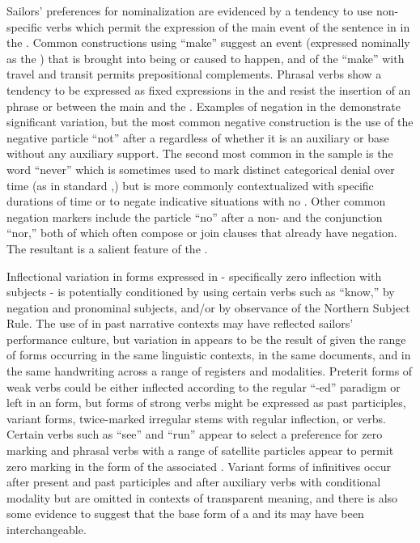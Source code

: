   Sailors’ preferences for nominalization are evidenced by a tendency to use non-specific verbs which permit the expression of the main event of the sentence in  in the . Common constructions using “make” suggest an event (expressed nominally as the ) that is brought into being or caused to happen, and  of the  “make” with travel and transit permits prepositional complements. Phrasal verbs show a tendency to be expressed as fixed expressions in the  and resist the insertion of an  phrase or  between the main  and the . Examples of negation in the  demonstrate significant variation, but the most common negative construction is the use of the negative particle “not” after a  regardless of whether it is an auxiliary or base  without any auxiliary support. The second most common  in the sample is the word “never” which is sometimes used to mark distinct categorical denial over time (as in standard ,) but is more commonly contextualized with specific durations of time or to negate indicative  situations with no . Other common negation markers include the particle “no” after a non- and the conjunction “nor,” both of which often compose or join clauses that already have negation. The resultant  is a salient feature of the . 

Inflectional variation in  forms expressed in  - specifically zero inflection with  subjects - is potentially conditioned by using certain verbs such as “know,” by negation and  pronominal subjects, and/or by observance of the Northern Subject Rule. The use of  in past narrative contexts may have reflected sailors’ performance culture, but variation in  appears to be the result of  given the range of forms occurring in the same linguistic contexts, in the same documents, and in the same handwriting across a range of registers and modalities. Preterit forms of weak verbs could be either inflected according to the regular “-ed” paradigm or left in an  form, but  forms of strong verbs might be expressed as past participles, variant  forms, twice-marked irregular stems with regular inflection, or  verbs. Certain verbs such as “see” and “run” appear to select a preference for zero marking and phrasal verbs with a range of satellite particles appear to permit zero marking in the  form of the associated . Variant forms of infinitives occur after present and past participles and after auxiliary verbs with conditional modality but are omitted in contexts of transparent meaning, and there is also some evidence to suggest that the base form of a  and its  may have been interchangeable.

